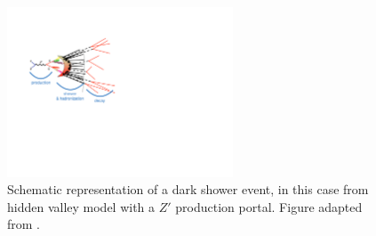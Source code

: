 \begin{enumerate}
\begin{figure}[t]\centering
\includegraphics[width=0.6\textwidth]{figures/DS_diagram}
\caption{Schematic representation of a dark shower event, in this case from hidden valley model with a $Z'$ production portal. Figure adapted from \cite{Strassler:2008fv}.\label{fig:showerdiagram}}
\end{figure}
\end{enumerate}

